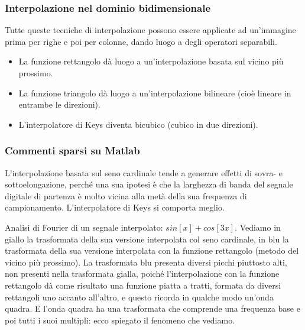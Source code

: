 \documentclass[a4paper,11pt]{article}
\begin{document}
\subsubsection{Interpolazione nel dominio bidimensionale}
Tutte queste tecniche di interpolazione possono essere applicate ad un'immagine prima per righe e poi per colonne, dando luogo a degli operatori separabili.
\begin{itemize}
    \item La funzione rettangolo dà luogo a un'interpolazione basata sul vicino più prossimo.
    \item La funzione triangolo dà luogo a un'interpolazione bilineare (cioè lineare in entrambe le direzioni).
    \item L'interpolatore di Keys diventa bicubico (cubico in due direzioni).
\end{itemize}

\subsubsection{Commenti sparsi su Matlab}
L'interpolazione basata sul seno cardinale tende a generare effetti di sovra- e sottoelongazione, perché una sua ipotesi è che la larghezza di banda
del segnale digitale di partenza è molto vicina alla metà della sua frequenza di campionamento. L'interpolatore di Keys si comporta meglio.
\par
Analisi di Fourier di un segnale interpolato: $sin[x] + cos[3x]$. Vediamo in giallo la trasformata della sua versione interpolata col seno cardinale,
in blu la trasformata della sua versione interpolata con la funzione rettangolo (metodo del vicino più prossimo). La trasformata blu presenta diversi picchi piuttosto
alti, non presenti nella trasformata gialla, poiché l'interpolazione con la funzione rettangolo dà come risultato una funzione piatta a tratti, formata da
diversi rettangoli uno accanto all'altro, e questo ricorda in qualche modo un'onda quadra. E l'onda quadra ha una trasformata che comprende una frequenza base e poi tutti i
suoi multipli: ecco spiegato il fenomeno che vediamo.
\end{document}
